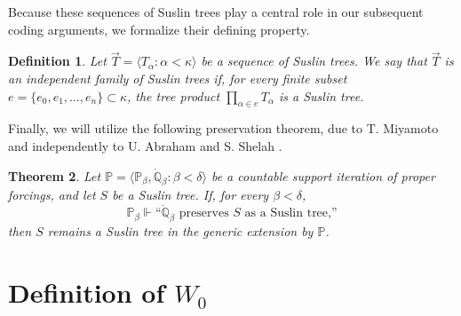 \documentclass[a4paper,11pt]{article}
\newtheorem{theorem}{Theorem}[section]
\newtheorem{definition}[theorem]{Definition}
\newcommand{\forceP}{\mathbb{P}}
\newcommand{\forceQ}{\mathbb{Q}}
\begin{document}
Because these sequences of Suslin trees play a central role in our subsequent coding arguments, we formalize their defining property.

\begin{definition}
 Let $\vec{T} = \langle T_\alpha : \alpha < \kappa \rangle$ be a sequence of Suslin trees. We say that $\vec{T}$ is an \emph{independent family of Suslin trees} if, for every finite subset $e = \{e_0, e_1, \dots, e_n\} \subset \kappa$, the tree product $\prod_{\alpha \in e} T_\alpha$ is a Suslin tree.
\end{definition}

Finally, we will utilize the following preservation theorem, due to T. Miyamoto \cite{Miyamoto} and independently to U. Abraham and S. Shelah \cite{abraham1993delta22}.

\begin{theorem}\label{preservation of Suslin trees under countable support}
Let $\forceP = \langle \forceP_\beta, \dot{\forceQ}_\beta : \beta < \delta \rangle$ be a countable support iteration of proper forcings, and let $S$ be a Suslin tree. If, for every $\beta < \delta$, 
\[ \forceP_\beta \Vdash \text{``}\dot{\forceQ}_\beta \text{ preserves } S \text{ as a Suslin tree,''} \] 
then $S$ remains a Suslin tree in the generic extension by $\forceP$.
\end{theorem}
\section{Definition of $W_0$}
\end{document}
